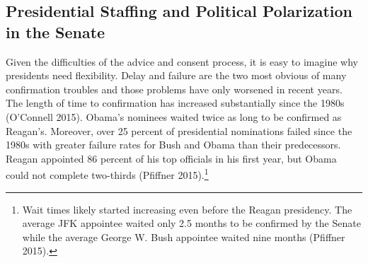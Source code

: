 \documentclass[12pt]{article}
\begin{document}
	
\subsection*{Presidential Staffing and Political Polarization in the Senate}

Given the difficulties of the advice and consent process, it is easy to imagine why presidents need flexibility. Delay and failure are the two most obvious of many confirmation troubles and those problems have only worsened in recent years. The length of time to confirmation has increased substantially since the 1980s (O'Connell 2015). Obama's nominees waited twice as long to be confirmed as Reagan's. Moreover, over 25 percent of presidential nominations failed since the 1980s with greater failure rates for Bush and Obama than their predecessors. Reagan appointed 86 percent of his top officials in his first year, but Obama could not complete two-thirds (Pfiffner 2015).\footnote{Wait times likely started increasing even before the Reagan presidency. The average JFK appointee waited only 2.5 months to be confirmed by the Senate while the average George W. Bush appointee waited nine months (Pfiffner 2015).} 
\end{document}

